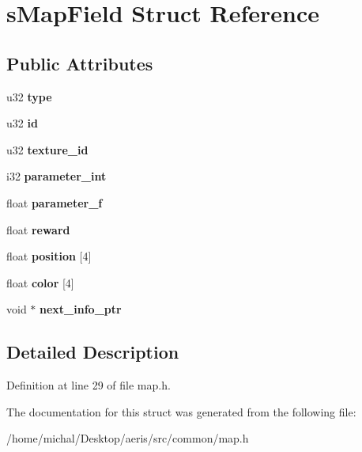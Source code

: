 \hypertarget{structsMapField}{\section{s\-Map\-Field Struct Reference}
\label{structsMapField}
}
\subsection*{Public Attributes}
\begin{DoxyCompactItemize}
\item 
\hypertarget{structsMapField_aeced840714c5559d2df1da458e1a4cd0}{u32 {\bfseries type}}\label{structsMapField_aeced840714c5559d2df1da458e1a4cd0}

\item 
\hypertarget{structsMapField_a8900aa98020edb668ad7adf2ff65a4d6}{u32 {\bfseries id}}\label{structsMapField_a8900aa98020edb668ad7adf2ff65a4d6}

\item 
\hypertarget{structsMapField_a979c036f4bc3a63667dab8eb101ae578}{u32 {\bfseries texture\-\_\-id}}\label{structsMapField_a979c036f4bc3a63667dab8eb101ae578}

\item 
\hypertarget{structsMapField_ad01d29cde28c22771a2a7810ae255c5c}{i32 {\bfseries parameter\-\_\-int}}\label{structsMapField_ad01d29cde28c22771a2a7810ae255c5c}

\item 
\hypertarget{structsMapField_a93b5280433256a0564226f7289e0afaf}{float {\bfseries parameter\-\_\-f}}\label{structsMapField_a93b5280433256a0564226f7289e0afaf}

\item 
\hypertarget{structsMapField_aa6e68c3d07bff370d335b7d0c34e41ab}{float {\bfseries reward}}\label{structsMapField_aa6e68c3d07bff370d335b7d0c34e41ab}

\item 
\hypertarget{structsMapField_ae8a51917bd125b1ded83536f5ac62b6f}{float {\bfseries position} \mbox{[}4\mbox{]}}\label{structsMapField_ae8a51917bd125b1ded83536f5ac62b6f}

\item 
\hypertarget{structsMapField_a70c6292d2c2581cce7487a9586d39173}{float {\bfseries color} \mbox{[}4\mbox{]}}\label{structsMapField_a70c6292d2c2581cce7487a9586d39173}

\item 
\hypertarget{structsMapField_a244dedc5792cf5bf6613e91d1dced91b}{void $\ast$ {\bfseries next\-\_\-info\-\_\-ptr}}\label{structsMapField_a244dedc5792cf5bf6613e91d1dced91b}

\end{DoxyCompactItemize}


\subsection{Detailed Description}


Definition at line 29 of file map.\-h.



The documentation for this struct was generated from the following file\-:\begin{DoxyCompactItemize}
\item 
/home/michal/\-Desktop/aeris/src/common/map.\-h\end{DoxyCompactItemize}
